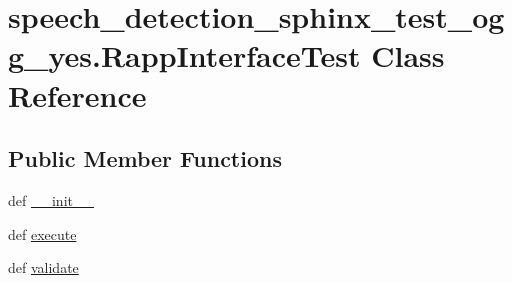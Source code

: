 \hypertarget{classspeech__detection__sphinx__test__ogg__yes_1_1RappInterfaceTest}{\section{speech\-\_\-detection\-\_\-sphinx\-\_\-test\-\_\-ogg\-\_\-yes.\-Rapp\-Interface\-Test Class Reference}
\label{classspeech__detection__sphinx__test__ogg__yes_1_1RappInterfaceTest}
}
\subsection*{Public Member Functions}
\begin{DoxyCompactItemize}
\item 
def \hyperlink{classspeech__detection__sphinx__test__ogg__yes_1_1RappInterfaceTest_a90e1bea7d4a43deb08e29910769e27e5}{\-\_\-\-\_\-init\-\_\-\-\_\-}
\item 
def \hyperlink{classspeech__detection__sphinx__test__ogg__yes_1_1RappInterfaceTest_a8dc6f0b6bdc3a8ec73a2db1425bb00d7}{execute}
\item 
def \hyperlink{classspeech__detection__sphinx__test__ogg__yes_1_1RappInterfaceTest_ad3cb13a05d4d8dd05e4884dedc36bb23}{validate}
\end{DoxyCompactItemize}
